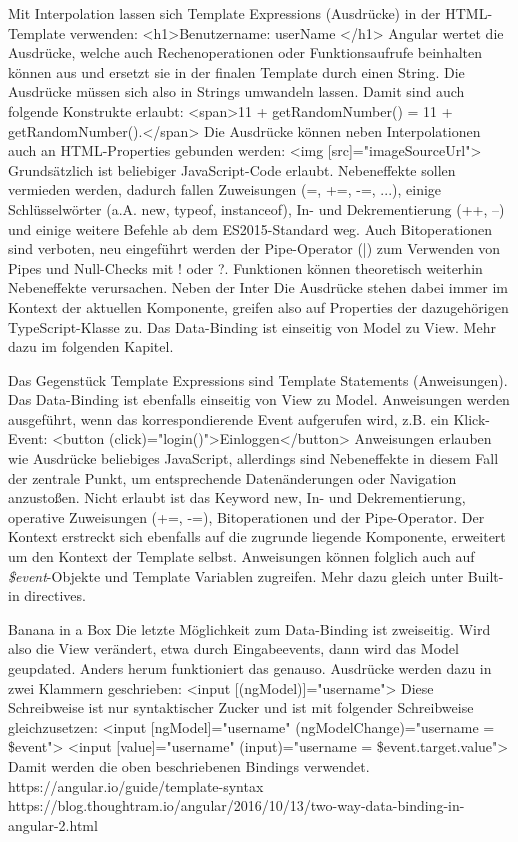 Mit Interpolation lassen sich Template Expressions (Ausdrücke) in der HTML-Template verwenden:
<h1>Benutzername: {{ userName }}</h1>
Angular wertet die Ausdrücke, welche auch Rechenoperationen oder Funktionsaufrufe beinhalten können aus und ersetzt sie in der finalen Template durch einen String. Die Ausdrücke müssen sich also in Strings umwandeln lassen. Damit sind auch folgende Konstrukte erlaubt:
<span>11 + {{getRandomNumber()}} = {{11 + getRandomNumber()}}.</span>
Die Ausdrücke können neben Interpolationen auch an HTML-Properties gebunden werden:
<img [src]="imageSourceUrl">
Grundsätzlich ist beliebiger JavaScript-Code erlaubt. Nebeneffekte sollen vermieden werden, dadurch fallen Zuweisungen (=, +=, -=, ...), einige Schlüsselwörter (a.A. new, typeof, instanceof), In- und Dekrementierung (++, --) und einige weitere Befehle ab dem ES2015-Standard weg. Auch Bitoperationen sind verboten, neu eingeführt werden der Pipe-Operator (|) zum Verwenden von Pipes und Null-Checks mit ! oder ?. Funktionen können theoretisch weiterhin Nebeneffekte verursachen. Neben der Inter
Die Ausdrücke stehen dabei immer im Kontext der aktuellen Komponente, greifen also auf Properties der dazugehörigen TypeScript-Klasse zu. Das Data-Binding ist einseitig von Model zu View. Mehr dazu im folgenden Kapitel.

Das Gegenstück Template Expressions sind Template Statements (Anweisungen). Das Data-Binding ist ebenfalls einseitig von View zu Model. Anweisungen werden ausgeführt, wenn das korrespondierende Event aufgerufen wird, z.B. ein Klick-Event:
<button (click)="login()">Einloggen</button>
Anweisungen erlauben wie Ausdrücke beliebiges JavaScript, allerdings sind Nebeneffekte in diesem Fall der zentrale Punkt, um entsprechende Datenänderungen oder Navigation anzustoßen. Nicht erlaubt ist das Keyword new, In- und Dekrementierung, operative Zuweisungen (+=, -=), Bitoperationen und der Pipe-Operator.
Der Kontext erstreckt sich ebenfalls auf die zugrunde liegende Komponente, erweitert um den Kontext der Template selbst. Anweisungen können folglich auch auf \textit{\$event}-Objekte und Template Variablen zugreifen. Mehr dazu gleich unter Built-in directives.

Banana in a Box
Die letzte Möglichkeit zum Data-Binding ist zweiseitig. Wird also die View verändert, etwa durch Eingabeevents, dann wird das Model geupdated. Anders herum funktioniert das genauso. Ausdrücke werden dazu in zwei Klammern geschrieben:
<input [(ngModel)]="username">
Diese Schreibweise ist nur syntaktischer Zucker und ist mit folgender Schreibweise gleichzusetzen:
<input [ngModel]="username" (ngModelChange)="username = \$event">
<input [value]="username" (input)="username = \$event.target.value">
Damit werden die oben beschriebenen Bindings verwendet.
https://angular.io/guide/template-syntax
https://blog.thoughtram.io/angular/2016/10/13/two-way-data-binding-in-angular-2.html

